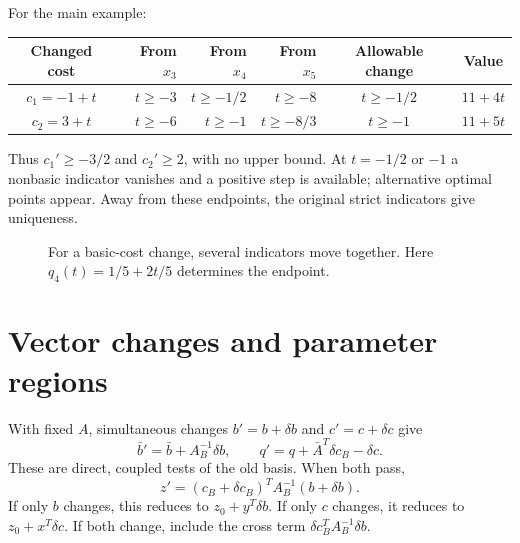 \documentclass[11pt,a4paper]{article}
\begin{document}
For the main example:
\begin{center}
  \begin{tabular}{c|rrr|c|c}\toprule
    Changed cost & From $x_3$ & From $x_4$ & From $x_5$
    & Allowable change & Value\\\midrule
    $c_1=-1+t$ & $t\geq-3$ & $t\geq-1/2$ & $t\geq-8$
    & $t\geq-1/2$ & $11+4t$\\
    $c_2=3+t$ & $t\geq-6$ & $t\geq-1$ & $t\geq-8/3$
    & $t\geq-1$ & $11+5t$\\\bottomrule
  \end{tabular}
\end{center}
Thus $c_1'\geq-3/2$ and $c_2'\geq2$, with no upper bound.
At $t=-1/2$ or $-1$ a nonbasic indicator vanishes and a positive step is
available; alternative optimal points appear. Away from these endpoints,
the original strict indicators give uniqueness.

\begin{figure}[H]\centering
  \caption{For a basic-cost change, several indicators move together.
    Here $q_4(t)=1/5+2t/5$ determines the endpoint.}
\end{figure}

\section{Vector changes and parameter regions}\label{sec:vector}
With fixed $A$, simultaneous changes $b'=b+\delta b$ and $c'=c+\delta c$
give
\begin{equation}\label{eq:joint-tests}
  \bar b'=\bar b+A_B^{-1}\delta b,\qquad
  q'=q+\bar A^T\delta c_B-\delta c.
\end{equation}
These are direct, coupled tests of the old basis. When both pass,
\begin{equation}\label{eq:joint-value}
  z'=(c_B+\delta c_B)^TA_B^{-1}(b+\delta b).
\end{equation}
If only $b$ changes, this reduces to $z_0+y^T\delta b$.
If only $c$ changes, it reduces to $z_0+x^T\delta c$.
If both change, include the cross term
$\delta c_B^TA_B^{-1}\delta b$.
\end{document}
